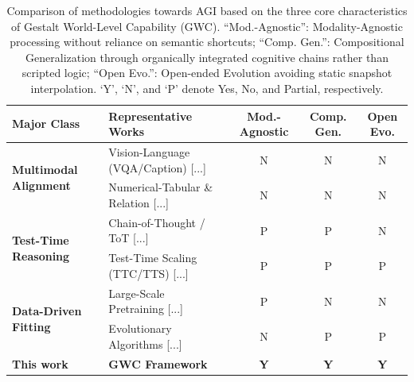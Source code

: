 
\begin{table}[!t]
    \centering
    \caption{Comparison of methodologies towards AGI based on the three core characteristics of Gestalt World-Level Capability (GWC). ``Mod.-Agnostic'': Modality-Agnostic processing without reliance on semantic shortcuts; ``Comp. Gen.'': Compositional Generalization through organically integrated cognitive chains rather than scripted logic; ``Open Evo.'': Open-ended Evolution avoiding static snapshot interpolation. `Y', `N', and `P' denote Yes, No, and Partial, respectively.}
    \label{tab:related_comparison}
    \renewcommand{\arraystretch}{1.1}
    \setlength{\tabcolsep}{6pt}
    \begin{tabular}{l l c c c}
        \toprule
        \textbf{Major Class} & \textbf{Representative Works} & \textbf{Mod.-Agnostic} & \textbf{Comp. Gen.} & \textbf{Open Evo.} \\
        \midrule
        \multirow{2}{*}{\textbf{Multimodal Alignment}} 
        & Vision-Language (VQA/Caption) [...] & N & N & N \\
        & Numerical-Tabular \& Relation [...] & N & N & N \\
        \midrule
        \multirow{2}{*}{\textbf{Test-Time Reasoning}} 
        & Chain-of-Thought / ToT [...] & P & P & N \\
        & Test-Time Scaling (TTC/TTS) [...] & P & P & P \\
        \midrule
        \multirow{2}{*}{\textbf{Data-Driven Fitting}} 
        & Large-Scale Pretraining [...] & P & N & N \\
        & Evolutionary Algorithms [...] & N & P & P \\
        \midrule
        \textbf{This work} & \textbf{GWC Framework} & \textbf{Y} & \textbf{Y} & \textbf{Y} \\
        \bottomrule
    \end{tabular}
    \vspace{-2mm}
\end{table}

